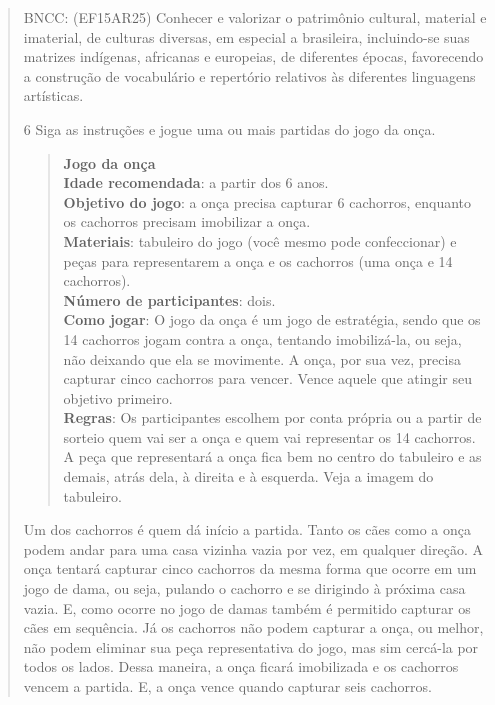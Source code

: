 \begin{quote}
{BNCC: (EF15AR25) Conhecer e valorizar o patrimônio cultural, material e
imaterial, de culturas diversas, em especial a brasileira, incluindo-se
suas matrizes indígenas, africanas e europeias, de diferentes épocas,
favorecendo a construção de vocabulário e repertório relativos às
diferentes linguagens artísticas.}

\num{6} Siga as instruções e jogue uma ou mais partidas do jogo da onça.

\begin{quote}
\textbf{Jogo da onça}\\
\textbf{Idade recomendada}: a partir dos 6 anos.\\
\textbf{Objetivo do jogo}: a onça precisa capturar 6 cachorros, enquanto
os cachorros precisam imobilizar a onça.\\
\textbf{Materiais}: tabuleiro do jogo (você mesmo pode confeccionar) e
peças para representarem a onça e os cachorros (uma onça e 14
cachorros).\\
\textbf{Número de participantes}: dois.\\
\textbf{Como jogar}: O jogo da onça é um jogo de estratégia, sendo que
os 14 cachorros jogam contra a onça, tentando imobilizá-la, ou seja, não
deixando que ela se movimente. A onça, por sua vez, precisa capturar
cinco cachorros para vencer. Vence aquele que atingir seu objetivo
primeiro.\\
\textbf{Regras}: Os participantes escolhem por conta própria ou a partir
de sorteio quem vai ser a onça e quem vai representar os 14 cachorros. A
peça que representará a onça fica bem no centro do tabuleiro e as
demais, atrás dela, à direita e à esquerda. Veja a imagem do tabuleiro.
\end{quote}



Um dos cachorros é quem dá início a partida. Tanto os cães como a onça
podem andar para uma casa vizinha vazia por vez, em qualquer direção. A
onça tentará capturar cinco cachorros da mesma forma que ocorre em um
jogo de dama, ou seja, pulando o cachorro e se dirigindo à próxima casa
vazia. E, como ocorre no jogo de damas também é permitido capturar os
cães em sequência. Já os cachorros não podem capturar a onça, ou melhor,
não podem eliminar sua peça representativa do jogo, mas sim cercá-la por
todos os lados. Dessa maneira, a onça ficará imobilizada e os cachorros
vencem a partida. E, a onça vence quando capturar seis cachorros.


\end{quote}
